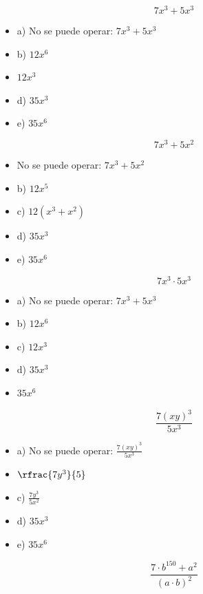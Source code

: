 \[
	7x^3+5x^3
\]

\begin{itemize}
	\item a) No se puede operar: $7x^3+5x^3$
	\item b) $12x^6$
	\item {} $12x^3$
	\item d) $35x^3$
	\item e) $35x^6$
\end{itemize}

\[
	7x^3+5x^2
\]

\begin{itemize}
	\item {}No se puede operar:  $7x^3+5x^2$
	\item b) $12x^5$
	\item c) $12(x^3+x^2)$
	\item d) $35x^3$
	\item e) $35x^6$
\end{itemize}

\[
	7x^3·5x^3
\]

\begin{itemize}
	\item a) No se puede operar: $7x^3+5x^3$
	\item b) $12x^6$
	\item c) $12x^3$
	\item d) $35x^3$
	\item {} $35x^6$
\end{itemize}


\[
	\frac{7(xy)^3}{5x^3}
\]

\begin{itemize}
	\item a) No se puede operar: $\frac{7(xy)^3}{5x^3}$
	\item {} $\rfrac{7y^3}{5}$
	\item c) $\frac{7y^3}{5x^2}$
	\item d) $35x^3$
	\item e) $35x^6$
\end{itemize}

\[
	\frac{7·b^{150}+a^2}{(a·b)^2}
\]

